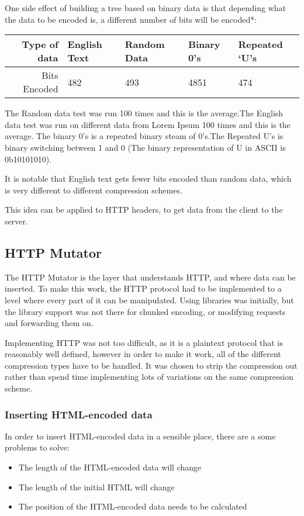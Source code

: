 \newpage
One side effect of building a tree based on binary data is that depending what the data to be encoded is, a different number of bits will be encoded*:

\begin{table}[ht]
\begin{tabular}{@{}rllll@{}}
\toprule
Type of data & English Text & Random Data & Binary 0's & Repeated `U's \\ \midrule
Bits Encoded & 482 & 493 & 4851 & 474 \\ \bottomrule
\end{tabular}
\end{table}
{\tiny * The Random data test was run 100 times and this is the average.The English data test was run on different data from Lorem Ipsum 100 times and this is the average. The binary 0's is a repeated binary steam of 0's.The Repeated U's is binary switching between 1 and 0 (The binary representation of U in ASCII is 0b10101010).}\par
\vspace{0.5cm}
It is notable that English text gets fewer bits encoded than random data, which is very different to different compression schemes.\par
\vspace{0.5cm}
This idea can be applied to HTTP headers, to get data from the client to the server.

\subsection{HTTP Mutator}
The HTTP Mutator is the layer that understands HTTP, and where data can be inserted.
To make this work, the HTTP protocol had to be implemented to a level where every part of it can be manipulated. Using libraries was initially,  but the library support was not there for chunked encoding, or modifying requests and forwarding them on.\par
Implementing HTTP was not too difficult, as it is a plaintext protocol that is reasonably well defined, however in order to make it work, all of the different compression types have to be handled. It was chosen to strip the compression out rather than spend time implementing lots of variations on the same compression scheme.\par

\subsubsection{Inserting HTML-encoded data}
In order to insert HTML-encoded data in a sensible place, there are a some problems to solve:
\begin{itemize}
    \item The length of the HTML-encoded data will change
    \item The length of the initial HTML will change
    \item The position of the HTML-encoded data needs to be calculated
\end{itemize}

